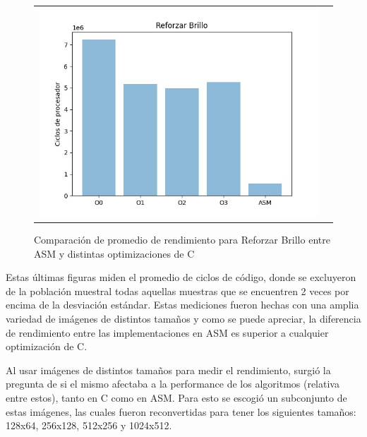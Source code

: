     \begin{figure}[h]
    \centering
    \begin{tabular}{cc}
        \includegraphics[width=0.5\linewidth]{img/ReforzarBrillo.jpeg}&
    \end{tabular}
    \caption{Comparación de promedio de rendimiento para Reforzar Brillo entre ASM y distintas optimizaciones de C}
\end{figure}

\par Estas últimas figuras miden el promedio de ciclos de código, donde se excluyeron de la población muestral todas aquellas muestras que se encuentren 2 veces por encima de la desviación estándar.
Estas mediciones fueron hechas con una amplia variedad de imágenes de distintos tamaños y como se puede apreciar, la diferencia de rendimiento entre las implementaciones en ASM es superior
a cualquier optimización de C.

\par Al usar imágenes de distintos tamaños para medir el rendimiento, surgió la pregunta de si el mismo afectaba a la performance de los algoritmos (relativa entre estos), tanto en C como en ASM.
Para esto se escogió un subconjunto de estas imágenes, las cuales fueron reconvertidas para tener los siguientes tamaños: 128x64, 256x128, 512x256 y 1024x512.


